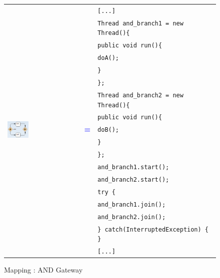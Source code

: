 \begin{figure}[h]
\begin{tabularx}{\linewidth}{lcX}
	\multirow{18}{*}{\includegraphics[width=0.3\textwidth]{images/mapping/and-gateway.png}} &  & \texttt{[...]}\\
	& & \texttt{Thread and\_branch1 = new Thread()\{}\\
	& & \texttt{\hspace{10pt}public void run()\{}\\
	& & \texttt{\hspace{20pt}doA();}\\
	& & \texttt{\hspace{10pt}\}}\\
	& & \texttt{\};}\\
	& & \texttt{Thread and\_branch2 = new Thread()\{}\\
	& & \texttt{\hspace{10pt}public void run()\{}\\
	& \textbf{\textcolor{blue}{=}} & \texttt{\hspace{20pt}doB();}\\
	& & \texttt{\hspace{10pt}\}}\\
	& & \texttt{\};}\\
	& & \texttt{and\_branch1.start();}\\
	& & \texttt{and\_branch2.start();}\\
	& & \texttt{try \{}\\
	& & \texttt{\hspace{10pt}and\_branch1.join();}\\
	& & \texttt{\hspace{10pt}and\_branch2.join();}\\
	& & \texttt{\} catch(InterruptedException) \{ \}}\\
	& & \texttt{[...]}\\
\end{tabularx}
\caption{Mapping : AND Gateway}%
\label{fig:mapping_AND}%
\end{figure}

